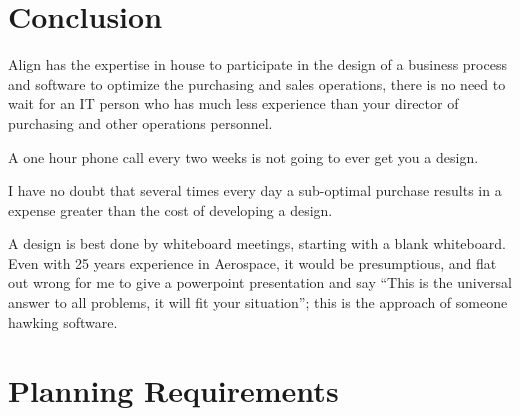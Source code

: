\documentclass[letterpaper,10pt,english]{sphinxmanual}
\begin{document}
\chapter{Conclusion}
\label{\detokenize{BusinessProcessReengineering:conclusion}}
Align has the expertise in house to participate in the design of a
business process and software to optimize the purchasing and sales
operations, there is no need to wait for an IT person who has much less
experience than your director of purchasing and other operations
personnel.

A one hour phone call every two weeks is not going to ever get you a
design.

I have no doubt that several times every day a sub-optimal purchase
results in a expense greater than the cost of developing a design.

A design is best done by whiteboard meetings, starting with a blank
whiteboard. Even with 25 years experience in Aerospace, it would be
presumptious, and flat out wrong for me to give a powerpoint
presentation and say “This is the universal answer to all problems, it
will fit your situation”; this is the approach of someone hawking
software.


\chapter{Planning Requirements}
\label{\detokenize{BusinessProcessReengineering:planning-requirements}}
\end{document}
